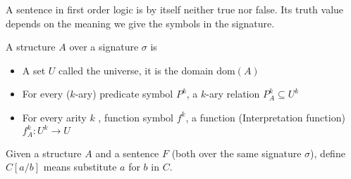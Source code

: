 \begin{remark}
A sentence in first order logic is by itself neither true nor false. Its truth value depends on the meaning we give the symbols in the signature.
\end{remark}

\begin{definition}[Structure]A structure $A$ over a signature \(\sigma\) is

\begin{itemize}
\item
  A set \(U\) called the universe, it is the domain $\mathrm{dom}(A)$
\item
  For every (\(k\)-ary) predicate symbol $P^k$, a \(k\)-ary relation
  \(P^k_A \subseteq U^k\)
\item
  For every arity \(k\) , function symbol \(f^k\), a function (Interpretation function)
  \(f^k_A : U^k \rightarrow U\)
\end{itemize}
\end{definition}

\begin{definition}[Substitution]
Given a structure $A$ and a sentence $F$ (both over the same signature $\sigma$),
define \(C[a / b]\) means substitute \(a\) for \(b\) in \(C\). 
\end{definition}

